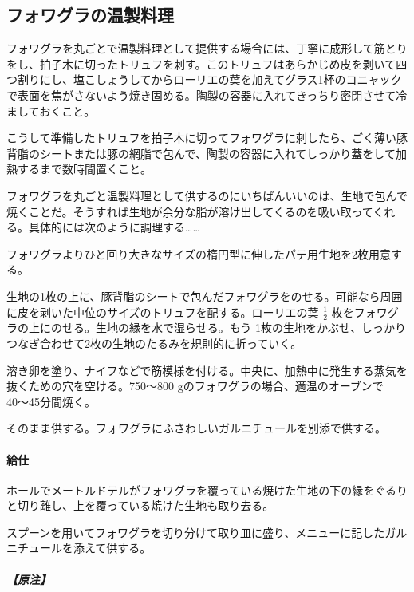 

\hypertarget{preparations-chaudes-du-foie-gras}{%
\subsection{フォワグラの温製料理}\label{preparations-chaudes-du-foie-gras}}

フォワグラを丸ごとで温製料理として提供する場合には、丁寧に成形して筋とりをし、拍子木に切ったトリュフを刺す。このトリュフはあらかじめ皮を剥いて四つ割りにし、塩こしょうしてからローリエの葉を加えてグラス1杯のコニャックで表面を焦がさないよう焼き固める。陶製の容器に入れてきっちり密閉させて冷ましておくこと。

こうして準備したトリュフを拍子木に切ってフォワグラに刺したら、ごく薄い豚背脂のシートまたは豚の網脂で包んで、陶製の容器に入れてしっかり蓋をして加熱するまで数時間置くこと。

フォワグラを丸ごと温製料理として供するのにいちばんいいのは、生地で包んで焼くことだ。そうすれば生地が余分な脂が溶け出してくるのを吸い取ってくれる。具体的には次のように調理する\ldots{}\ldots{}

フォワグラよりひと回り大きなサイズの楕円型に伸したパテ用生地を2枚用意する。

生地の1枚の上に、豚背脂のシートで包んだフォワグラをのせる。可能なら周囲に皮を剥いた中位のサイズのトリュフを配する。ローリエの葉
\(\frac{1}{2}\) 枚をフォワグラの上にのせる。生地の縁を水で湿らせる。もう
1枚の生地をかぶせ、しっかりつなぎ合わせて2枚の生地のたるみを規則的に折っていく。

溶き卵を塗り、ナイフなどで筋模様を付ける。中央に、加熱中に発生する蒸気を抜くための穴を空ける。750〜800
gのフォワグラの場合、適温のオーブンで 40〜45分間焼く。

そのまま供する。フォワグラにふさわしいガルニチュールを別添で供する。

\hypertarget{ux7d66ux4ed5}{%
\paragraph{給仕}\label{ux7d66ux4ed5}}

ホールでメートルドテルがフォワグラを覆っている焼けた生地の下の縁をぐるりと切り離し、上を覆っている焼けた生地も取り去る。

スプーンを用いてフォワグラを切り分けて取り皿に盛り、メニューに記したガルニチュールを添えて供する。

\hypertarget{ux539fux6ce8}{%
\subparagraph{【原注】}\label{ux539fux6ce8}}

